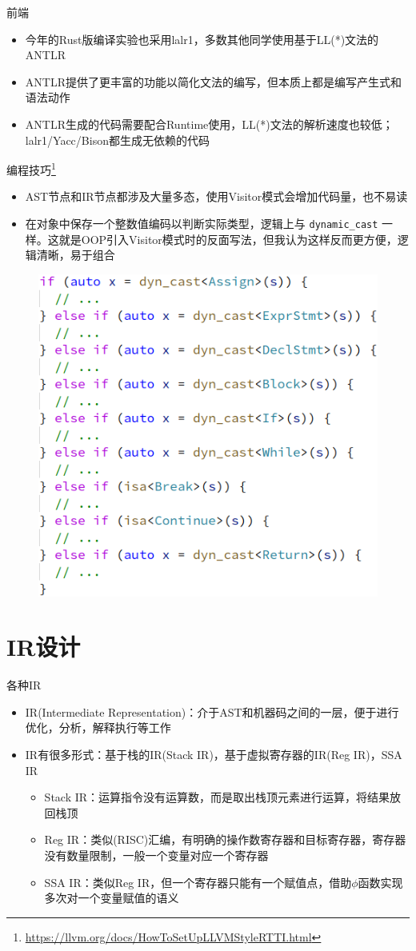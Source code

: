 \documentclass{beamer}
\begin{document}
\begin{frame}{前端}
\begin{itemize}
  \item 今年的Rust版编译实验也采用lalr1，多数其他同学使用基于LL(*)文法的ANTLR
  \item ANTLR提供了更丰富的功能以简化文法的编写，但本质上都是编写产生式和语法动作
  \item ANTLR生成的代码需要配合Runtime使用，LL(*)文法的解析速度也较低；lalr1/Yacc/Bison都生成无依赖的代码
\end{itemize}
\end{frame}

\begin{frame}{编程技巧\footnote[1]{\href{https://llvm.org/docs/HowToSetUpLLVMStyleRTTI.html}{https://llvm.org/docs/HowToSetUpLLVMStyleRTTI.html}}}
\begin{itemize}
  \item AST节点和IR节点都涉及大量多态，使用Visitor模式会增加代码量，也不易读
  \item 在对象中保存一个整数值编码以判断实际类型，逻辑上与 \lstinline|dynamic_cast| 一样。这就是OOP引入Visitor模式时的反面写法，但我认为这样反而更方便，逻辑清晰，易于组合
\end{itemize}
\begin{figure}[htpb]
  \centering
  \includegraphics[width=0.4\linewidth]{pic/match.png}
\end{figure}
\end{frame}

\section{IR设计}

\begin{frame}{各种IR}
\begin{itemize}
  \item IR(Intermediate Representation)：介于AST和机器码之间的一层，便于进行优化，分析，解释执行等工作
  \item IR有很多形式：基于栈的IR(Stack IR)，基于虚拟寄存器的IR(Reg IR)，SSA IR
  \begin{itemize}
    \item Stack IR：运算指令没有运算数，而是取出栈顶元素进行运算，将结果放回栈顶
    \item Reg IR：类似(RISC)汇编，有明确的操作数寄存器和目标寄存器，寄存器没有数量限制，一般一个变量对应一个寄存器
    \item SSA IR：类似Reg IR，但一个寄存器只能有一个赋值点，借助$\phi$函数实现多次对一个变量赋值的语义
  \end{itemize}
\end{itemize}
\end{frame}
\end{document}
